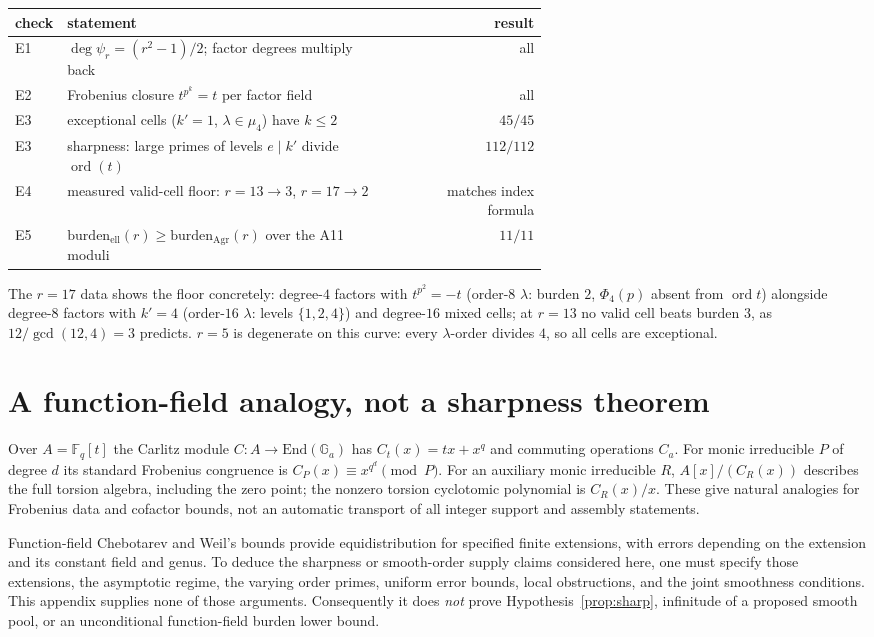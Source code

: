 \documentclass[11pt]{article}
\theoremstyle{remark}
\newcommand{\F}{\mathbb{F}}
\DeclareMathOperator{\ord}{ord}
\begin{document}
\begin{center}
\begin{tabular}{@{}lp{0.62\linewidth}r@{}}
\hline
check & statement & result \\
\hline
E1 & $\deg \psi_r = (r^2-1)/2$; factor degrees multiply back & all \\
E2 & Frobenius closure $t^{p^k} = t$ per factor field & all \\
E3 & exceptional cells ($k' = 1$, $\lambda \in \mu_4$) have $k \le 2$ &
$45/45$ \\
E3 & sharpness: large primes of levels $e \mid k'$ divide $\ord(t)$ &
$112/112$ \\
E4 & measured valid-cell floor: $r = 13 \to 3$, $r = 17 \to 2$ &
matches index formula \\
E5 & $\mathrm{burden}_{\mathrm{ell}}(r) \ge
     \mathrm{burden}_{\mathrm{Agr}}(r)$ over the A11 moduli & $11/11$ \\
\hline
\end{tabular}
\end{center}

The $r = 17$ data shows the floor concretely: degree-$4$ factors with
$t^{p^2} = -t$ (order-$8$ $\lambda$: burden $2$, $\Phi_4(p)$ absent from
$\ord t$) alongside degree-$8$ factors with $k' = 4$ (order-$16$
$\lambda$: levels $\{1,2,4\}$) and degree-$16$ mixed cells; at $r = 13$
no valid cell beats burden $3$, as $12/\gcd(12,4) = 3$ predicts. $r = 5$
is degenerate on this curve: every $\lambda$-order divides $4$, so all
cells are exceptional.

\appendix

\section{A function-field analogy, not a sharpness theorem}\label{app:ff}

Over $A=\F_q[t]$ the Carlitz module
$C:A\to\mathrm{End}(\mathbb G_a)$ has $C_t(x)=tx+x^q$ and commuting
operations $C_a$. For monic irreducible $P$ of degree $d$ its standard
Frobenius congruence is $C_P(x)\equiv x^{q^d}\pmod P$.
For an auxiliary monic irreducible $R$, $A[x]/(C_R(x))$ describes the
full torsion algebra, including the zero point; the nonzero torsion
cyclotomic polynomial is $C_R(x)/x$. These give natural analogies for
Frobenius data and cofactor bounds, not an automatic transport of all
integer support and assembly statements.

Function-field Chebotarev and Weil's bounds provide equidistribution for
specified finite extensions, with errors depending on the extension and
its constant field and genus. To deduce the sharpness or smooth-order supply
claims considered here, one must specify those extensions, the asymptotic
regime, the varying order primes, uniform error bounds, local obstructions,
and the joint smoothness conditions. This appendix supplies none of those
arguments. Consequently it does \emph{not} prove
Hypothesis~\ref{prop:sharp}, infinitude of a proposed smooth pool, or an
unconditional function-field burden lower bound.
\end{document}
